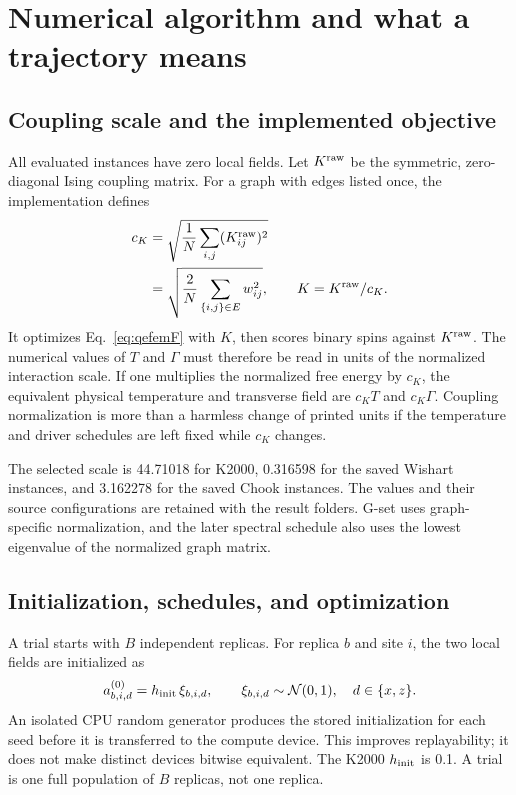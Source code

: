 \section{Numerical algorithm and what a trajectory means}
\label{sec:algorithm}

\subsection{Coupling scale and the implemented objective}

All evaluated instances have zero local fields. Let $K^{\rm raw}$ be the
symmetric, zero-diagonal Ising coupling matrix. For a graph with edges
listed once, the implementation defines
\begin{equation}
 \begin{aligned}
 c_K&=\sqrt{\frac{1}{N}\sum_{i,j}(K^{\rm raw}_{ij})^2}\\
    &=\sqrt{\frac{2}{N}\sum_{\{i,j\}\in E}w_{ij}^2},
 \qquad K=K^{\rm raw}/c_K.
 \end{aligned}
 \label{eq:rmscoupling}
\end{equation}
It optimizes Eq.~\eqref{eq:qefemF} with $K$, then scores binary spins
against $K^{\rm raw}$. The numerical values of $T$ and $\Gamma$ must
therefore be read in units of the normalized interaction scale. If one
multiplies the normalized free energy by $c_K$, the equivalent physical
temperature and transverse field are $c_KT$ and $c_K\Gamma$. Coupling
normalization is more than a harmless change of printed units if the
temperature and driver schedules are left fixed while $c_K$ changes.

The selected scale is 44.71018 for K2000, 0.316598 for the saved Wishart
instances, and 3.162278 for the saved Chook instances. The values and
their source configurations are retained with the result folders. G-set
uses graph-specific normalization, and the later spectral schedule also
uses the lowest eigenvalue of the normalized graph matrix.

\subsection{Initialization, schedules, and optimization}

A trial starts with $B$ independent replicas. For replica $b$ and site $i$,
the two local fields are initialized as
\begin{equation}
 a^{(0)}_{b,i,d}=h_{\rm init}\,\xi_{b,i,d},
 \qquad \xi_{b,i,d}\sim\mathcal N(0,1),\quad d\in\{x,z\}.
 \label{eq:init}
\end{equation}
An isolated CPU random generator produces the stored initialization for
each seed before it is transferred to the compute device. This improves
replayability; it does not make distinct devices bitwise equivalent.
The K2000 $h_{\rm init}$ is 0.1. A trial is one full population of $B$
replicas, not one replica.

